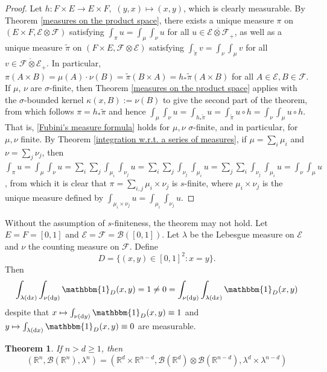 \documentclass[11pt, a4paper, openany]{book}
\newtheorem{thm}{Theorem}\newtheorem{lem}{Lemma}\newtheorem{crl}{Corollary}
\theoremstyle{definition}
\begin{document}
    \begin{proof}
        Let $h:F\times E\rightarrow E\times F,\,\,(y,x)\mapsto (x,y)$, which is clearly measurable. 
        By Theorem \ref{measures on the product space}, there exists a unique measure 
        $\pi$ on $(E\times F,\mathscr{E}\otimes \mathscr{F})$ satisfying 
        $\int_\pi u=\int_{\mu}\int_{\nu} u$ for all $u\in \overline{\mathscr{E}\otimes\mathscr{F}}_+$,
        as well as a unique measure $\tilde{\pi}$ on $(F\times E,\mathscr{F}\otimes \mathscr{E})$ satisfying $\int_{\tilde{\pi}} v=\int_{\nu}\int_{\mu} v$ for all $v\in \overline{\mathscr{F}\otimes\mathscr{E}}_+$. 
        In particular, $\pi(A\times B)=\mu(A)\cdot \nu(B)=\tilde{\pi}(B\times A)=h_*\tilde{\pi}(A\times B)$ for all $A\in\mathscr{E}, B\in\mathscr{F}$.  
        If $\mu$, $\nu$ are $\sigma$-finite, then Theorem \ref{measures on the product space} applies with the $\sigma$-bounded kernel $\kappa(x,B):=\nu(B)$ to give the second part of the theorem, from which follows $\pi=h_*\tilde{\pi}$ and hence $\int_{\mu}\int_{\nu} u=\int_{h_*\tilde{\pi}} u=\int_{\tilde{\pi}} u\circ h=\int_{\nu}\int_{\mu} u\circ h$. That is, \eqref{Fubini's measure formula} holds for $\mu,\nu$ $\sigma$-finite, and in particular, for $\mu,\nu$ finite. By Theorem \ref{integration w.r.t. a series of measures}, if $\mu=\sum_i\mu_i$ and $\nu=\sum_j\nu_j$, then $\int_\pi u=\int_{\mu}\int_{\nu} u=\sum_i\sum_j\int_{\mu_i}\int_{\nu_j}u=\sum_i\sum_j\int_{\nu_j}\int_{\mu_i}u=\sum_j\sum_i\int_{\nu_j}\int_{\mu_i}u=\int_{\nu}\int_{\mu} u$, from which it is clear that $\pi=\sum_{i,j}\mu_i\times\nu_j$ is $s$-finite, where $\mu_i\times\nu_j$ is the unique measure defined by $\int_{\mu_i\times\nu_j}u=\int_{\mu_i}\int_{\nu_j}u$.
    \end{proof}
    Without the assumption of $s$-finiteness, the theorem may not hold. Let $E=F=[0,1]$ and $\mathscr{E}=\mathscr{F}=\mathscr{B}([0,1])$. Let $\lambda$ be the Lebesgue measure on $\mathscr{E}$ and $\nu$ the counting measure on $\mathscr{F}$.
    Define
    \[
        D=\{(x,y)\in [0,1]^2:x=y\}.
    \]
    Then
    \[
        \int_{\lambda(\odif x)}\int_{\nu(\odif y)} \mathbbm{1}_{D}(x,y)=1\neq 0=\int_{\nu(\odif y)} \int_{\lambda(\odif x)}\mathbbm{1}_{D}(x,y)
    \]
    despite that $x\mapsto \int_{\nu(\odif y)} \mathbbm{1}_{D}(x,y)\equiv 1$ and $y\mapsto \int_{\lambda(\odif x)}\mathbbm{1}_{D}(x,y)\equiv 0$ are measurable.
    \begin{thm}
        If $n>d\geqslant 1$, then
        \[(\mathbb{R}^n,\mathscr{B}(\mathbb{R}^n),\lambda^n)=\left(\mathbb{R}^d\times \mathbb{R}^{n-d},\mathscr{B}(\mathbb{R}^d)\otimes \mathscr{B}(\mathbb{R}^{n-d}),\lambda^d\times \lambda^{n-d}\right)\]
    \end{thm}
\end{document}
